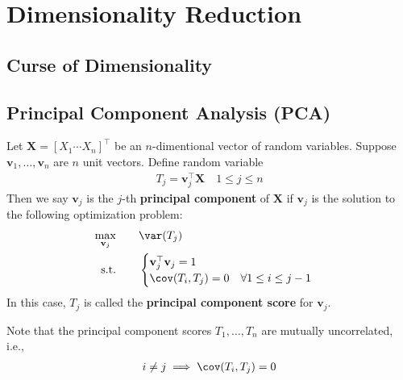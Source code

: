 \documentclass[color=blue, thmcnt=section, 12pt]{elegantbook}
\begin{document}


\chapter{Dimensionality Reduction}


\section{Curse of Dimensionality}


\section{Principal Component Analysis (PCA)}


\begin{definition}
    Let $\mathbf{X} = \left[X_1 \cdots X_n\right]^\top$ be an $n$-dimentional vector of random variables. Suppose $\mathbf{v}_1, \ldots, \mathbf{v}_n$ are $n$ unit vectors. Define random variable
    \begin{align*}
        T_j = \mathbf{v}_j^\top \mathbf{X}
        \quad 1 \leq j \leq n
    \end{align*}
    Then we say $\mathbf{v}_j$ is the $j$-th \textbf{principal component}  of $\mathbf{X}$ if $\mathbf{v}_j$ is the solution to the following optimization problem:
    \begin{alignat}{2}
        \max_{\mathbf{v}_j}&\quad & &\var(T_j) \label{eq:1}\\ 
        \text{s.t.}& & &\begin{cases}
            \mathbf{v}_j^\top \mathbf{v}_j = 1 \nonumber\\
            \cov(T_i, T_j) = 0 \quad \forall 1 \leq i \leq j-1
        \end{cases}
    \end{alignat}
    In this case, $T_j$ is called the \textbf{principal component score}  for $\mathbf{v}_j$.
\end{definition}

\begin{remark}
    Note that the principal component scores $T_1, \ldots, T_n$ are mutually uncorrelated, i.e., 
    \begin{align*}
        i \neq j \implies \cov(T_i, T_j) = 0 
    \end{align*}
\end{remark}
\end{document}
